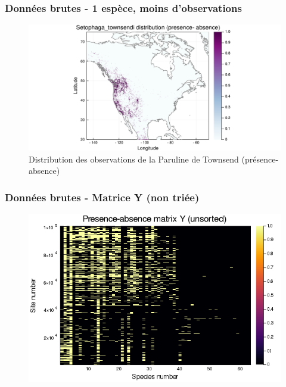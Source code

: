\documentclass[10pt]{beamer}
\begin{document}
\begin{frame}
  \frametitle{Données brutes - 1 espèce, moins d'observations}
  \begin{figure}
    \centering
    \hspace*{-2cm}\includegraphics[scale=0.5]{fig/raw-sp-Setophaga_townsendi.pdf}
    \caption{Distribution des observations de la Paruline de Townsend (présence-absence)}
  \end{figure}
\end{frame}

\begin{frame}
  \frametitle{Données brutes - Matrice Y (non triée)}
  \begin{figure}
    \centering
    \hspace*{-2cm}\includegraphics[scale=0.5]{fig/raw-Y-unsorted.png}
  \end{figure}
\end{frame}
\end{document}
